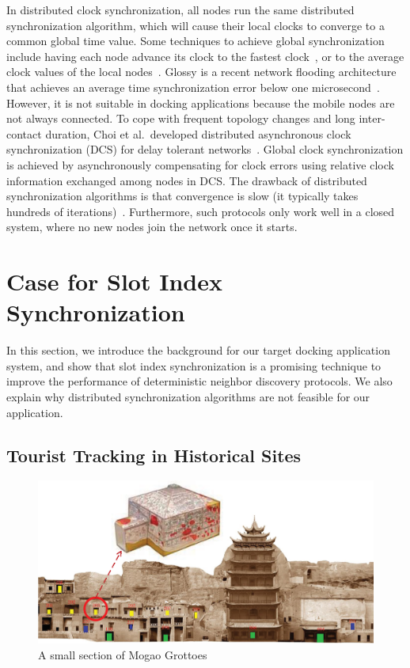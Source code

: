 \documentclass[twoside,twocolumn]{article}
\begin{document}
In distributed clock synchronization, all nodes run the same distributed synchronization algorithm, which 
will cause their local clocks to converge to a common global time value.  Some techniques to achieve global 
synchronization include having each node advance its clock to the fastest clock~\citep{jiang2004clock,zhou2007accurate}, 
or to the average clock values of the local nodes~\citep{li2006global,sommer2009gradient,sasabe2009simple}.  
Glossy is a recent network flooding architecture that achieves an average time synchronization error below 
one microsecond~\citep{ferrari11glossy}.  However, it is not suitable in docking applications because the 
mobile nodes are not always connected.  To cope with frequent topology changes and long inter-contact duration, 
Choi et al.\ developed distributed asynchronous clock synchronization (DCS) for delay tolerant networks~\citep{choi2012dcs}.  
Global clock synchronization is achieved by asynchronously compensating for clock errors using relative clock
information exchanged among nodes in DCS. The drawback of distributed synchronization algorithms is that 
convergence is slow (it typically takes hundreds of iterations)~\citep{he12random}. Furthermore, such
protocols only work well in a closed system, where no new nodes join the network once it starts.

\section{Case for Slot Index Synchronization}
\label{sec:challenge}
In this section, we introduce the background for our target docking application system, 
and show that slot index synchronization is a promising technique to improve the 
performance of deterministic neighbor discovery protocols. We also explain why distributed
synchronization algorithms are not feasible for our application.

\subsection{Tourist Tracking in Historical Sites}

\begin{figure}[t]
  \centering 
  \includegraphics[scale=0.35]{static/mogao}
  \caption{A small section of Mogao Grottoes}
  \label{fig:mogao}
\end{figure}
\end{document}

